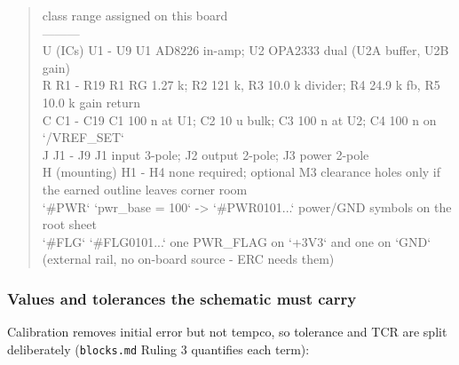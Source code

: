\documentclass[11pt,a4paper]{article}
\begin{document}
\begin{quote}\small\ttfamily\raggedright
\textbar{} class \textbar{} range \textbar{} assigned on this board \textbar{}\\
\textbar{}---\textbar{}---\textbar{}---\textbar{}\\
\textbar{} U (ICs) \textbar{} U1 - U9 \textbar{} U1 AD8226 in-amp; U2 OPA2333 dual (U2A buffer, U2B gain) \textbar{}\\
\textbar{} R \textbar{} R1 - R19 \textbar{} R1 RG 1.27 k; R2 121 k, R3 10.0 k divider; R4 24.9 k fb, R5 10.0 k gain return \textbar{}\\
\textbar{} C \textbar{} C1 - C19 \textbar{} C1 100 n at U1; C2 10 u bulk; C3 100 n at U2; C4 100 n on `/VREF\_SET` \textbar{}\\
\textbar{} J \textbar{} J1 - J9 \textbar{} J1 input 3-pole; J2 output 2-pole; J3 power 2-pole \textbar{}\\
\textbar{} H (mounting) \textbar{} H1 - H4 \textbar{} none required; optional M3 clearance holes only if the earned outline leaves corner room \textbar{}\\
\textbar{} `\#PWR` \textbar{} `pwr\_base = 100` -\textgreater{} `\#PWR0101...` \textbar{} power/GND symbols on the root sheet \textbar{}\\
\textbar{} `\#FLG` \textbar{} `\#FLG0101...` \textbar{} one PWR\_FLAG on `+3V3` and one on `GND` (external rail, no on-board source - ERC needs them) \textbar{}
\end{quote}
\subsubsection*{Values and tolerances the schematic must carry}
Calibration removes initial error but not tempco, so tolerance and TCR are split deliberately (\texttt{blocks.md} Ruling 3 quantifies each term):
\end{document}

